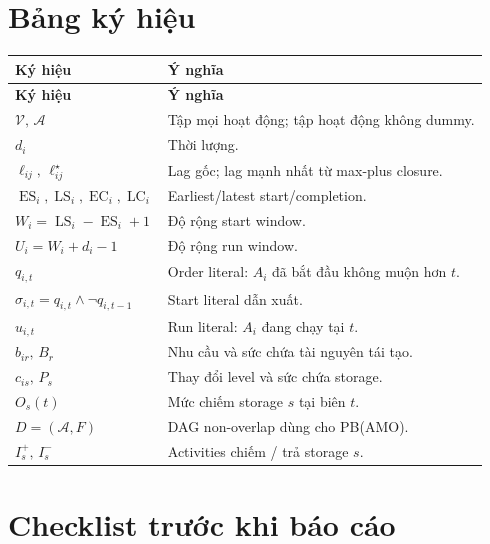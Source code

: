 \documentclass[11pt,a4paper]{article}
\theoremstyle{remark}
\newcommand{\ES}{\operatorname{ES}}
\newcommand{\LS}{\operatorname{LS}}
\newcommand{\EC}{\operatorname{EC}}
\newcommand{\LC}{\operatorname{LC}}
\begin{document}
\appendix
\section{Bảng ký hiệu}

\begin{longtable}{@{}p{}p{}@{}}
\toprule \textbf{Ký hiệu} & \textbf{Ý nghĩa}\\ \midrule
\endfirsthead \toprule \textbf{Ký hiệu} & \textbf{Ý nghĩa}\\ \midrule \endhead
$\mathcal{V},\, \mathcal{A}$ & Tập mọi hoạt động; tập hoạt động không dummy.\\
$d_i$ & Thời lượng.\\
$\ell_{ij},\, \ell^\star_{ij}$ & Lag gốc; lag mạnh nhất từ max-plus closure.\\
$\ES_i, \LS_i, \EC_i, \LC_i$ & Earliest/latest start/completion.\\
$W_i = \LS_i - \ES_i + 1$ & Độ rộng start window.\\
$U_i = W_i + d_i - 1$ & Độ rộng run window.\\
$q_{i,t}$ & Order literal: $A_i$ đã bắt đầu không muộn hơn $t$.\\
$\sigma_{i,t} = q_{i,t}\wedge\neg q_{i,t-1}$ & Start literal dẫn xuất.\\
$u_{i,t}$ & Run literal: $A_i$ đang chạy tại $t$.\\
$b_{ir},\, B_r$ & Nhu cầu và sức chứa tài nguyên tái tạo.\\
$c_{is},\, P_s$ & Thay đổi level và sức chứa storage.\\
$O_s(t)$ & Mức chiếm storage $s$ tại biên $t$.\\
$D = (\mathcal{A}, F)$ & DAG non-overlap dùng cho PB(AMO).\\
$I_s^+,\, I_s^-$ & Activities chiếm / trả storage $s$.\\
\bottomrule
\end{longtable}

\section{Checklist trước khi báo cáo}
\end{document}
